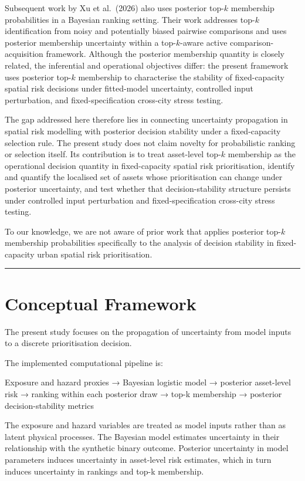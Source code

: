 \documentclass[
]{article}
\begin{document}
Subsequent work by Xu et al.~(2026) also uses posterior top-\(k\)
membership probabilities in a Bayesian ranking setting. Their work
addresses top-\(k\) identification from noisy and potentially biased
pairwise comparisons and uses posterior membership uncertainty within a
top-\(k\)-aware active comparison-acquisition framework. Although the
posterior membership quantity is closely related, the inferential and
operational objectives differ: the present framework uses posterior
top-\(k\) membership to characterise the stability of fixed-capacity
spatial risk decisions under fitted-model uncertainty, controlled input
perturbation, and fixed-specification cross-city stress testing.

The gap addressed here therefore lies in connecting uncertainty
propagation in spatial risk modelling with posterior decision stability
under a fixed-capacity selection rule. The present study does not claim
novelty for probabilistic ranking or selection itself. Its contribution
is to treat asset-level top-\(k\) membership as the operational decision
quantity in fixed-capacity spatial risk prioritisation, identify and
quantify the localised set of assets whose prioritisation can change
under posterior uncertainty, and test whether that decision-stability
structure persists under controlled input perturbation and
fixed-specification cross-city stress testing.

To our knowledge, we are not aware of prior work that applies posterior
top-\(k\) membership probabilities specifically to the analysis of
decision stability in fixed-capacity urban spatial risk prioritisation.

\begin{center}\rule{0.5\linewidth}{0.5pt}\end{center}

\section{Conceptual Framework}\label{conceptual-framework}

The present study focuses on the propagation of uncertainty from model
inputs to a discrete prioritisation decision.

The implemented computational pipeline is:

Exposure and hazard proxies → Bayesian logistic model → posterior
asset-level risk → ranking within each posterior draw → top-k membership
→ posterior decision-stability metrics

The exposure and hazard variables are treated as model inputs rather
than as latent physical processes. The Bayesian model estimates
uncertainty in their relationship with the synthetic binary outcome.
Posterior uncertainty in model parameters induces uncertainty in
asset-level risk estimates, which in turn induces uncertainty in
rankings and top-k membership.
\end{document}
